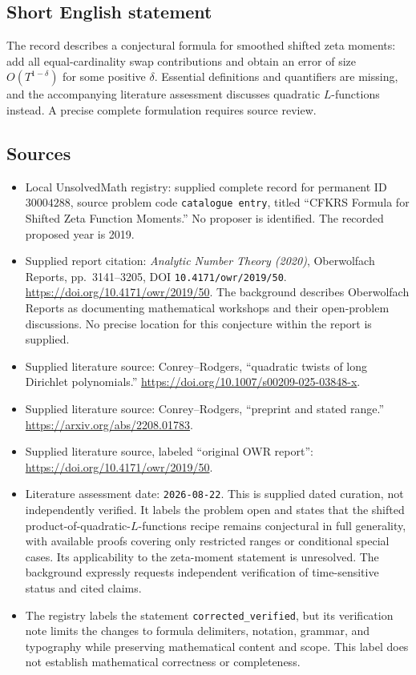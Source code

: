 \documentclass[11pt]{article}
\begin{document}
\subsection{Short English statement}
The record describes a conjectural formula for smoothed shifted zeta moments: add all equal-cardinality swap contributions and obtain an error of size \(O(T^{1-\delta})\) for some positive \(\delta\). Essential definitions and quantifiers are missing, and the accompanying literature assessment discusses quadratic \(L\)-functions instead. A precise complete formulation requires source review.
\subsection{Sources}
\begin{itemize}
\item Local UnsolvedMath registry: supplied complete record for permanent ID \(30004288\), source problem code \texttt{catalogue entry}, titled ``CFKRS Formula for Shifted Zeta Function Moments.'' No proposer is identified. The recorded proposed year is 2019.
\item Supplied report citation: \emph{Analytic Number Theory (2020)}, Oberwolfach Reports, pp.\ 3141--3205, DOI \texttt{10.4171/owr/2019/50}. \url{https://doi.org/10.4171/owr/2019/50}. The background describes Oberwolfach Reports as documenting mathematical workshops and their open-problem discussions. No precise location for this conjecture within the report is supplied.
\item Supplied literature source: Conrey--Rodgers, ``quadratic twists of long Dirichlet polynomials.'' \url{https://doi.org/10.1007/s00209-025-03848-x}.
\item Supplied literature source: Conrey--Rodgers, ``preprint and stated range.'' \url{https://arxiv.org/abs/2208.01783}.
\item Supplied literature source, labeled ``original OWR report'': \url{https://doi.org/10.4171/owr/2019/50}.
\item Literature assessment date: \texttt{2026-08-22}. This is supplied dated curation, not independently verified. It labels the problem open and states that the shifted product-of-quadratic-\(L\)-functions recipe remains conjectural in full generality, with available proofs covering only restricted ranges or conditional special cases. Its applicability to the zeta-moment statement is unresolved. The background expressly requests independent verification of time-sensitive status and cited claims.
\item The registry labels the statement \texttt{corrected\_verified}, but its verification note limits the changes to formula delimiters, notation, grammar, and typography while preserving mathematical content and scope. This label does not establish mathematical correctness or completeness.
\end{itemize}
\end{document}

